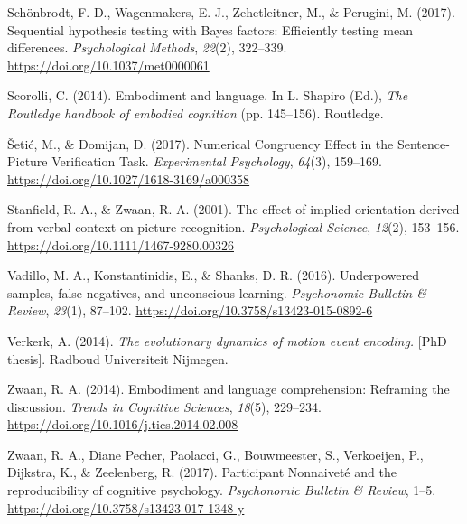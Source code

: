 \documentclass[
  man]{apa7}
\newlength{\cslhangindent}
\newlength{\cslentryspacingunit} %
\newenvironment{CSLReferences}[2] %
 {%
  \setlength{\parindent}{0pt}
  \ifodd #1
  \let\oldpar\par
  \def\par{\hangindent=\cslhangindent\oldpar}
  \fi
  \setlength{\parskip}{#2\cslentryspacingunit}
 }%
 {}
\begin{document}
\begin{CSLReferences}{1}{0}
\leavevmode{}%
Schönbrodt, F. D., Wagenmakers, E.-J., Zehetleitner, M., \& Perugini, M. (2017). Sequential hypothesis testing with {Bayes} factors: {Efficiently} testing mean differences. \emph{Psychological Methods}, \emph{22}(2), 322--339. \url{https://doi.org/10.1037/met0000061}

\leavevmode{}%
Scorolli, C. (2014). Embodiment and language. In L. Shapiro (Ed.), \emph{The {Routledge} handbook of embodied cognition} (pp. 145--156). {Routledge}.

\leavevmode{}%
Šetić, M., \& Domijan, D. (2017). Numerical {Congruency Effect} in the {Sentence-Picture Verification Task}. \emph{Experimental Psychology}, \emph{64}(3), 159--169. \url{https://doi.org/10.1027/1618-3169/a000358}

\leavevmode{}%
Stanfield, R. A., \& Zwaan, R. A. (2001). The effect of implied orientation derived from verbal context on picture recognition. \emph{Psychological Science}, \emph{12}(2), 153--156. \url{https://doi.org/10.1111/1467-9280.00326}

\leavevmode{}%
Vadillo, M. A., Konstantinidis, E., \& Shanks, D. R. (2016). Underpowered samples, false negatives, and unconscious learning. \emph{Psychonomic Bulletin \& Review}, \emph{23}(1), 87--102. \url{https://doi.org/10.3758/s13423-015-0892-6}

\leavevmode{}%
Verkerk, A. (2014). \emph{The evolutionary dynamics of motion event encoding.} {[}PhD thesis{]}. Radboud Universiteit Nijmegen.

\leavevmode{}%
Zwaan, R. A. (2014). Embodiment and language comprehension: Reframing the discussion. \emph{Trends in Cognitive Sciences}, \emph{18}(5), 229--234. \url{https://doi.org/10.1016/j.tics.2014.02.008}

\leavevmode{}%
Zwaan, R. A., Diane Pecher, Paolacci, G., Bouwmeester, S., Verkoeijen, P., Dijkstra, K., \& Zeelenberg, R. (2017). Participant {Nonnaiveté} and the reproducibility of cognitive psychology. \emph{Psychonomic Bulletin \& Review}, 1--5. \url{https://doi.org/10.3758/s13423-017-1348-y}


\end{CSLReferences}
\end{document}
